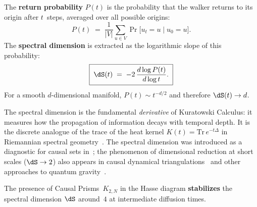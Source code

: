 \begin{definition}
\label{def:spectral-dimension}
The \textbf{return probability} $P(t)$ is the probability that
the walker returns to its origin after $t$~steps, averaged
over all possible origins:
\[
  P(t) \;=\; \frac{1}{|V|}\sum_{u \in V}
  \Pr\bigl[u_t = u \;\big|\; u_0 = u\bigr].
\]
The \textbf{spectral dimension} is extracted as the logarithmic
slope of this probability:
\begin{equation}
  \boxed{\;
  \dS(t) \;=\; -2\,\frac{d\log P(t)}{d\log t}.
  \;}
  \label{eq:spectral-dim}
\end{equation}
For a smooth $d$-dimensional manifold, $P(t) \sim t^{-d/2}$
and therefore $\dS(t) \to d$.
\end{definition}


\noindent
The spectral dimension is the fundamental \emph{derivative} of
Kuratowski Calculus: it measures how the propagation of
information decays with temporal depth. It is the discrete analogue
of the trace of the heat kernel
$K(t) = \mathrm{Tr}\,e^{-t\Delta}$ in Riemannian spectral
geometry~\cite{minakshisundaram1949,gilkey1975}. The
spectral dimension was introduced as a diagnostic for
causal sets in~\cite{eichhorn2014}; the phenomenon of
dimensional reduction at short scales ($\dS \to 2$) also appears
in causal dynamical
triangulations~\cite{ambjorn2005} and other approaches to quantum
gravity~\cite{carlip2009,modesto2009}.

\begin{theorem}
\label{thm:dimensional-stabilization}
The presence of Causal Prisms~$K_{2,N}$ in the Hasse diagram
\textbf{stabilizes} the spectral dimension $\dS$ around~$4$
at intermediate diffusion times.
\end{theorem}

